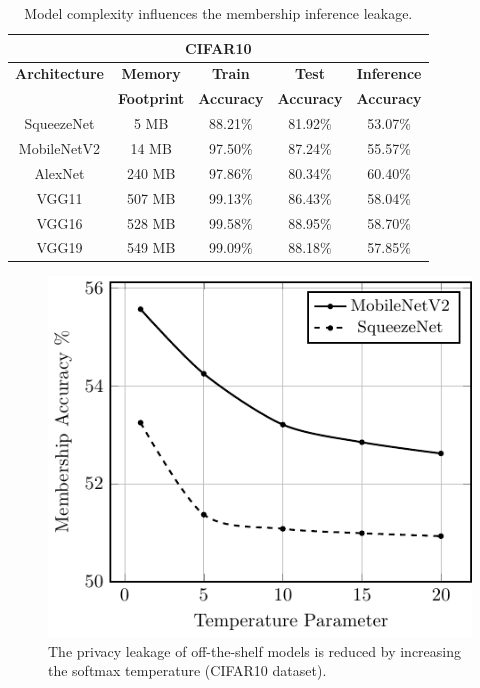 \begin{table}[h]
\begin{center}
\renewcommand\arraystretch{1.5}
\fontsize{6.5pt}{6.5pt}\selectfont
\begin{tabular}{|c|c|c|c|c|}
\hline
\multicolumn{5}{|c|}{\textbf{CIFAR10}}\\
\hline
\textbf{Architecture} & \textbf{Memory} & \textbf{Train}  & \textbf{Test}  & \textbf{Inference}   \\
 & \textbf{Footprint} & \textbf{Accuracy} & \textbf{Accuracy} & \textbf{Accuracy}  \\
\hline
SqueezeNet & 5 MB & 88.21\% & 81.92\% & \cellcolor{green!25}53.07\% \\
MobileNetV2 & 14 MB & 97.50\% & 87.24\% & \cellcolor{green!25}55.57\% \\
\hline
AlexNet & 240 MB & 97.86\% & 80.34\% & \cellcolor{red!25}60.40\% \\
VGG11 & 507 MB & 99.13\% & 86.43\% & \cellcolor{red!25}58.04\% \\
VGG16 & 528 MB & 99.58\% & 88.95\% & \cellcolor{red!25}58.70\%  \\
VGG19 & 549 MB & 99.09\% & 88.18\% & \cellcolor{red!25}57.85\% \\
\hline
\end{tabular}
\end{center}
\caption{Model complexity influences the membership inference leakage.}
\label{stdarch}
\vspace{-0mm}
\end{table}


\begin{figure}
  \includegraphics[width=0.6\columnwidth]{figures/efficientArch.pdf}
  \caption{The privacy leakage of off-the-shelf models is reduced by increasing the softmax temperature (CIFAR10 dataset).}
  \label{softmax}
\vspace{-0mm}
\end{figure}

